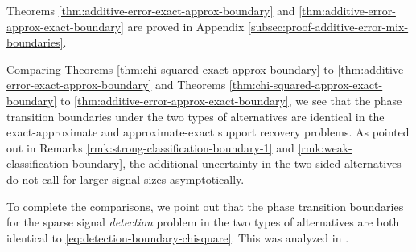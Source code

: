 Theorems \ref{thm:additive-error-exact-approx-boundary} and \ref{thm:additive-error-approx-exact-boundary} are proved in Appendix \ref{subsec:proof-additive-error-mix-boundaries}. 

\begin{remark}
Comparing Theorems \ref{thm:chi-squared-exact-approx-boundary} to \ref{thm:additive-error-exact-approx-boundary} and Theorems \ref{thm:chi-squared-approx-exact-boundary} to \ref{thm:additive-error-approx-exact-boundary}, we see that the phase transition boundaries under the two types of alternatives are identical in the exact-approximate and approximate-exact support recovery problems.
As pointed out in Remarks \ref{rmk:strong-classification-boundary-1} and \ref{rmk:weak-classification-boundary}, the additional uncertainty in the two-sided alternatives do not call for larger signal sizes asymptotically.

To complete the comparisons, we point out that the phase transition boundaries for the sparse signal \emph{detection} problem in the two types of alternatives are both identical to \eqref{eq:detection-boundary-chisquare}. This was analyzed in \cite{donoho2004higher}.
\end{remark}
